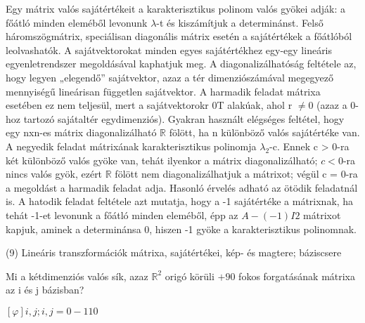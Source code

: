 \begin{frame}
  \begin{tcolorbox}[title={8/6. {\symqueen}}]
     Egy mátrix valós sajátértékeit a karakterisztikus polinom valós gyökei adják: a főátló minden eleméből levonunk ${\lambda}$-t és kiszámítjuk a determinánst. Felső háromszögmátrix, speciálisan diagonális mátrix esetén a sajátértékek a főátlóból leolvashatók. A sajátvektorokat minden egyes sajátértékhez egy-egy lineáris egyenletrendszer megoldásával kaphatjuk meg. A diagonalizálhatóság feltétele az, hogy legyen „elegendő” sajátvektor, azaz a tér dimenziószámával megegyező mennyiségű lineárisan független sajátvektor. A harmadik feladat mátrixa esetében ez nem teljesül, mert a sajátvektorokr 0T alakúak, ahol r $\neq 0$ (azaz a 0-hoz tartozó sajátaltér egydimenziós). Gyakran használt elégséges feltétel, hogy egy nxn-es mátrix diagonalizálható $\mathbb{R}$ fölött, ha n különböző valós sajátértéke van. A negyedik feladat mátrixának karakterisztikus polinomja ${\lambda}_2$-c. Ennek c > 0-ra két különböző valós gyöke van, tehát ilyenkor a mátrix diagonalizálható; $c < 0$-ra nincs valós gyök, ezért $\mathbb{R}$ fölött nem diagonalizálhatjuk a mátrixot; végül c = 0-ra a megoldást a harmadik feladat adja. Hasonló érvelés adható az ötödik feladatnál is. A hatodik feladat feltétele azt mutatja, hogy a -1 sajátértéke a mátrixnak, ha tehát -1-et levonunk a főátló minden eleméből, épp az $A-(-1)I2$ mátrixot kapjuk, aminek a determinánsa 0, hiszen -1 gyöke a karakterisztikus polinomnak.

  \end{tcolorbox}
\end{frame}



\begin{frame}[plain]
\begin{tcolorbox}[center, colback={myyellow}, coltext={black}, colframe={myyellow}]
    {\RHuge  (9) Lineáris transzformációk mátrixa, sajátértékei, kép- és magtere; báziscsere }
    \mmedskip
\end{tcolorbox}
\end{frame}

\begin{frame}
  \begin{tcolorbox}[title={9/1. {\symknight}}]
    Mi a kétdimenziós valós sík, azaz $\mathbb{R}^2$ origó körüli $+90$ fokos forgatásának mátrixa az i és j bázisban?

  \tcblower

    \mmedskip 
    
    $[{\varphi}]i,j;i,j = 0 -1 1 0$
  \end{tcolorbox}
\end{frame}


